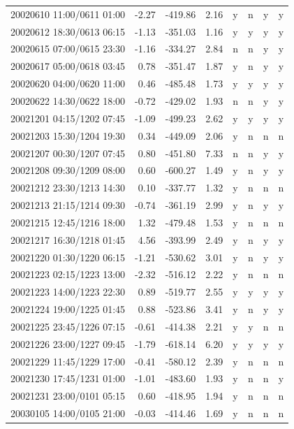 \documentclass[linenumbers,draft]{agujournal}
\begin{document}
\begin{center}
\begin{longtable}{l|rcc|cccc}
20020610 11:00/0611 01:00 & -2.27 & -419.86 & 2.16 & y & n & y & y \\
20020612 18:30/0613 06:15 & -1.13 & -351.03 & 1.16 & y & y & y & y \\
20020615 07:00/0615 23:30 & -1.16 & -334.27 & 2.84 & n & n & y & y \\
20020617 05:00/0618 03:45 & 0.78 & -351.47 & 1.87 & y & n & y & y \\
20020620 04:00/0620 11:00 & 0.46 & -485.48 & 1.73 & y & y & y & y \\
20020622 14:30/0622 18:00 & -0.72 & -429.02 & 1.93 & n & n & y & y \\
20021201 04:15/1202 07:45 & -1.09 & -499.23 & 2.62 & y & y & y & y \\
20021203 15:30/1204 19:30 & 0.34 & -449.09 & 2.06 & y & n & n & n \\
20021207 00:30/1207 07:45 & 0.80 & -451.80 & 7.33 & n & n & y & y \\
20021208 09:30/1209 08:00 & 0.60 & -600.27 & 1.49 & y & n & y & y \\
20021212 23:30/1213 14:30 & 0.10 & -337.77 & 1.32 & y & n & n & n \\
20021213 21:15/1214 09:30 & -0.74 & -361.19 & 2.99 & y & n & y & y \\
20021215 12:45/1216 18:00 & 1.32 & -479.48 & 1.53 & y & n & n & n \\
20021217 16:30/1218 01:45 & 4.56 & -393.99 & 2.49 & y & n & y & y \\
20021220 01:30/1220 06:15 & -1.21 & -530.62 & 3.01 & y & n & y & y \\
20021223 02:15/1223 13:00 & -2.32 & -516.12 & 2.22 & y & n & n & n \\
20021223 14:00/1223 22:30 & 0.89 & -519.77 & 2.55 & y & y & y & y \\
20021224 19:00/1225 01:45 & 0.88 & -523.86 & 3.41 & y & n & y & y \\
20021225 23:45/1226 07:15 & -0.61 & -414.38 & 2.21 & y & y & n & n \\
20021226 23:00/1227 09:45 & -1.79 & -618.14 & 6.20 & y & y & y & y \\
20021229 11:45/1229 17:00 & -0.41 & -580.12 & 2.39 & y & n & n & n \\
20021230 17:45/1231 01:00 & -1.01 & -483.60 & 1.93 & y & n & n & y \\
20021231 23:00/0101 05:15 & 0.60 & -418.95 & 1.94 & y & n & n & n \\
20030105 14:00/0105 21:00 & -0.03 & -414.46 & 1.69 & y & n & n & n \\

\end{longtable}
\end{center}
\end{document}
